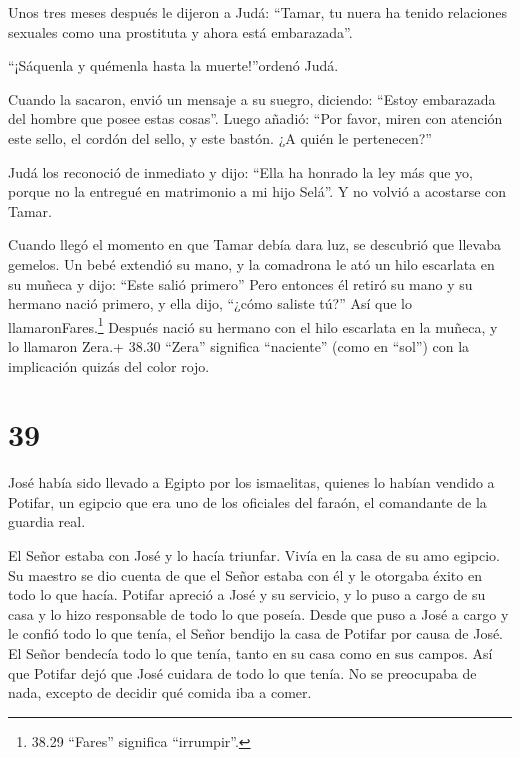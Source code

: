  Unos tres meses después le dijeron a Judá: ``Tamar, tu
nuera ha tenido relaciones sexuales como una prostituta y ahora está
embarazada''.

``¡Sáquenla y quémenla hasta la muerte!''ordenó Judá.

 Cuando la sacaron, envió un mensaje a su suegro, diciendo:
``Estoy embarazada del hombre que posee estas cosas''. Luego añadió:
``Por favor, miren con atención este sello, el cordón del sello, y este
bastón. ¿A quién le pertenecen?''

 Judá los reconoció de inmediato y dijo: ``Ella ha honrado
la ley más que yo, porque no la entregué en matrimonio a mi hijo Selá''.
Y no volvió a acostarse con Tamar.

 Cuando llegó el momento en que Tamar debía dara luz, se
descubrió que llevaba gemelos.  Un bebé extendió su mano, y
la comadrona le ató un hilo escarlata en su muñeca y dijo: ``Este salió
primero''  Pero entonces él retiró su mano y su hermano
nació primero, y ella dijo, ``¿cómo saliste tú?'' Así que lo
llamaronFares.\footnote{38.29 ``Fares'' significa ``irrumpir''.}
 Después nació su hermano con el hilo escarlata en la
muñeca, y lo llamaron Zera.+ 38.30 ``Zera'' significa ``naciente'' (como
en ``sol'') con la implicación quizás del color rojo.

\hypertarget{section-38}{%
\section{39}\label{section-38}}

 José había sido llevado a Egipto por los ismaelitas,
quienes lo habían vendido a Potifar, un egipcio que era uno de los
oficiales del faraón, el comandante de la guardia real.

 El Señor estaba con José y lo hacía triunfar. Vivía en la
casa de su amo egipcio.  Su maestro se dio cuenta de que el
Señor estaba con él y le otorgaba éxito en todo lo que hacía.
 Potifar apreció a José y su servicio, y lo puso a cargo de
su casa y lo hizo responsable de todo lo que poseía.  Desde
que puso a José a cargo y le confió todo lo que tenía, el Señor bendijo
la casa de Potifar por causa de José. El Señor bendecía todo lo que
tenía, tanto en su casa como en sus campos.  Así que Potifar
dejó que José cuidara de todo lo que tenía. No se preocupaba de nada,
excepto de decidir qué comida iba a comer.


